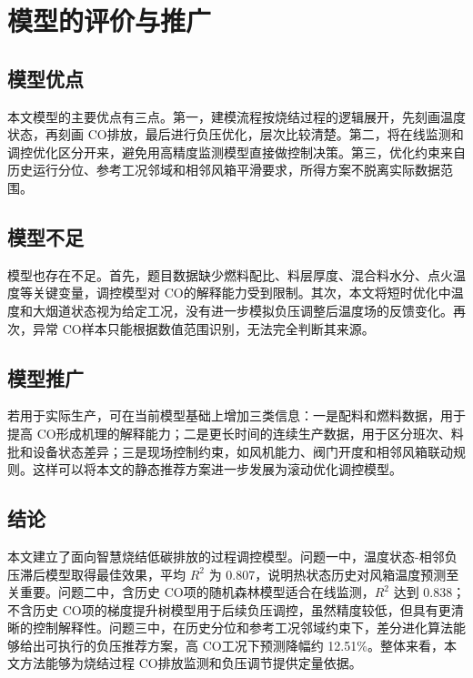 \documentclass[UTF8,a4paper,zihao=-4]{ctexart}
\newcommand{\CO}{CO}
\begin{document}
\section{模型的评价与推广}

\subsection{模型优点}

本文模型的主要优点有三点。第一，建模流程按烧结过程的逻辑展开，先刻画温度状态，再刻画 \CO 排放，最后进行负压优化，层次比较清楚。第二，将在线监测和调控优化区分开来，避免用高精度监测模型直接做控制决策。第三，优化约束来自历史运行分位、参考工况邻域和相邻风箱平滑要求，所得方案不脱离实际数据范围。

\subsection{模型不足}

模型也存在不足。首先，题目数据缺少燃料配比、料层厚度、混合料水分、点火温度等关键变量，调控模型对 \CO 的解释能力受到限制。其次，本文将短时优化中温度和大烟道状态视为给定工况，没有进一步模拟负压调整后温度场的反馈变化。再次，异常 \CO 样本只能根据数值范围识别，无法完全判断其来源。

\subsection{模型推广}

若用于实际生产，可在当前模型基础上增加三类信息：一是配料和燃料数据，用于提高 \CO 形成机理的解释能力；二是更长时间的连续生产数据，用于区分班次、料批和设备状态差异；三是现场控制约束，如风机能力、阀门开度和相邻风箱联动规则。这样可以将本文的静态推荐方案进一步发展为滚动优化调控模型。

\subsection{结论}

本文建立了面向智慧烧结低碳排放的过程调控模型。问题一中，温度状态-相邻负压滞后模型取得最佳效果，平均 $R^2$ 为 0.807，说明热状态历史对风箱温度预测至关重要。问题二中，含历史 \CO 项的随机森林模型适合在线监测，$R^2$ 达到 0.838；不含历史 \CO 项的梯度提升树模型用于后续负压调控，虽然精度较低，但具有更清晰的控制解释性。问题三中，在历史分位和参考工况邻域约束下，差分进化算法能够给出可执行的负压推荐方案，高 \CO 工况下预测降幅约 12.51\%。整体来看，本文方法能够为烧结过程 \CO 排放监测和负压调节提供定量依据。

\printbibliography[title={参考文献}]
\end{document}
